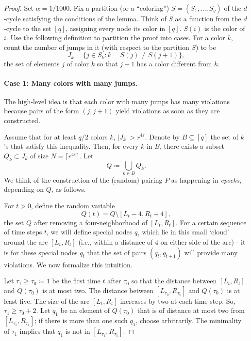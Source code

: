 \documentclass[10pt,a4paper]{article}
\theoremstyle{definition}%
\theoremstyle{plain}
\newcommand{\eps}{\varepsilon}
\begin{document}
\begin{proof}
Set $\alpha = 1/1000$. Fix a partition (or a ``coloring'') $S = (S_1,\ldots, S_q)$ of the $d$-cycle satisfying the conditions of the lemma.
Think of $S$ as a function from the $d$-cycle to the set $[q]$, assigning every node its color in $[q]$. $S(i)$ is the
color of $i$. Use the following definition to partition the proof into cases. For a color $k$, count the
number of jumps in it (with respect to the partition $S$) to be
\[
J_k = \{j \in S_k : k = S(j) \neq S(j + 1)\},
\]
the set of elements $j$ of color $k$ so that $j + 1$ has a color different from $k$. 

\paragraph{Case 1: Many colors with many jumps.}  The high-level idea is that each color with many jumps
has many violations because pairs of the form $(j, j + 1)$ yield violations as soon as they are constructed.

Assume that for at least $q/2$ colors $k$,
$|J_k| > r^{4\eps}$.
Denote by $B \subseteq [q]$ the set of $k$’s that satisfy this inequality. Then, for every $k$ in $B$, there exists
a subset $Q_k \subset J_k$ of size $N = \lceil r^{4\eps}\rceil$. Let
\[
Q \coloneqq \bigcup_{k\in B} Q_k.
\]
We think of the construction of the (random) pairing $P$ as happening in \emph{epochs}, depending on $Q$, as
follows.


For $t > 0$, define the random variable
\[
Q(t) = Q \setminus [L_t - 4, R_t + 4],
\]
the set $Q$ after removing a four-neighborhood of $[L_t, R_t]$. %
For a certain sequence of time steps $t$, we will define special nodes $q_t$ which lie in this small `cloud' around the arc $[L_t,R_t]$ (i.e., within a distance of $4$ on either side of the arc) - it is for these special nodes $q_t$ that the set of pairs $(q_t,q_{t+1})$ will provide many violations. We now formalize this intuition. 

Let $\tau_1 \geq \tau_0 \coloneqq 1$ be the first time $t$ after $\tau_0$ so that the distance between $[L_t
, R_t
]$ and $Q(\tau_0)$ is
at most two. The distance between $[L_{\tau_0
}
, R_{\tau_0}
]$ and $Q(\tau_0)$ is at least five. The size of the arc $[L_t
, R_t
]$ increases by two at each time step. So, $\tau_1 \geq \tau_0+ 2$. Let $q_1$ be an element of $Q(\tau_0)$ that is of distance
at most two from $[L_{\tau_1}
, R_{\tau_1}
]$; if there is more than one such $q_1$, choose arbitrarily. The minimality
of $\tau_1$ implies that $q_1$ is not in $[L_{\tau_1}
, R_{\tau_1}
]$.


\end{proof}
\end{document}
